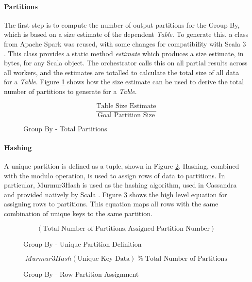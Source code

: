 \paragraph{Partitions}
The first step is to compute the number of output partitions for the Group By, which is based on a size estimate of the dependent \textit{Table}. To generate this, a class from Apache Spark was reused, with some changes for compatibility with Scala 3 \cite{zaharia2016spark}. This class provides a static method \textit{estimate} which produces a size estimate, in bytes, for any Scala object. The orchestrator calls this on all partial results across all workers, and the estimates are totalled to calculate the total size of all data for a \textit{Table}. Figure \ref{fig:group-by-num-partitions} shows how the size estimate can be used to derive the total number of partitions to generate for a \textit{Table}.

\begin{figure}[h]
	\centering
	\[ \frac{\text{Table Size Estimate}}{\text{Goal Partition Size}} \]
	\caption{Group By - Total Partitions}
	\label{fig:group-by-num-partitions}
\end{figure}


\pagebreak
\paragraph{Hashing} 
A unique partition is defined as a tuple, shown in Figure \ref{fig:group-by-unique-partition}. Hashing, combined with the modulo operation, is used to assign rows of data to partitions. In particular, Murmur3Hash is used as the hashing algorithm, used in Cassandra and provided natively by Scala \cite{murmur3hash}. Figure \ref{fig:group-by-partition-assign} shows the high level equation for assigning rows to partitions. This equation maps all rows with the same combination of unique keys to the same partition.

\begin{figure}[h]
	\centering
	\[ (\text{Total Number of Partitions}, \text{Assigned Partition Number}) \]
	\caption{Group By - Unique Partition Definition}
	\label{fig:group-by-unique-partition}
\end{figure} 

\begin{figure}[h]
	\centering
	\[ Murmur3Hash(\text{Unique Key Data}) \; \%  \; \text{Total Number of Partitions} \]
	\caption{Group By - Row Partition Assignment}
	\label{fig:group-by-partition-assign}
\end{figure} 

